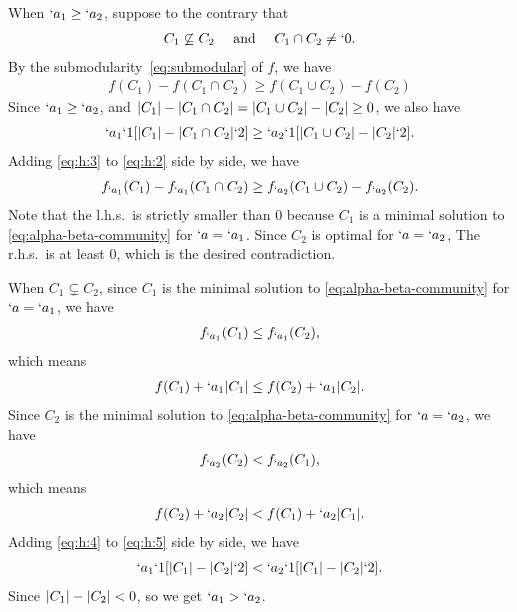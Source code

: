 \begin{Proof}
  When $`a_1 \geq `a_2$, suppose to the contrary that
  \begin{align}
    C_1\not \subseteq C_2 \kern1em \text{ and }\kern1em C_1\cap C_2\neq `0. \label{eq:h:1}
  \end{align}
  By the submodularity~\eqref{eq:submodular} of $f$, we have 
  \begin{align}
    f(C_1) - f(C_1\cap C_2) \geq f(C_1\cup C_2) - f(C_2) \label{eq:h:2}
  \end{align}
  Since $`a_1\geq `a_2$, and $\lvert C_1\rvert - \lvert C_1\cap C_2\rvert
  = \lvert C_1\cup C_2\rvert - \lvert C_2\rvert \geq 0$, we also have
  \begin{align}
    `a_1 `1[\lvert C_1\rvert- \lvert C_1\cap C_2\rvert`2]
    \geq  `a_2 `1[\lvert C_1\cup C_2\rvert - \lvert C_2\rvert`2]. \label{eq:h:3}
  \end{align}
  Adding \eqref{eq:h:3} to \eqref{eq:h:2} side by side, we have
  \begin{align*}
    f_{`a_1}(C_1) - f_{`a_1}(C_1\cap C_2) \geq f_{`a_2}(C_1\cup C_2) - f_{`a_2}(C_2).
  \end{align*}
  Note that the l.h.s.\ is strictly smaller than $0$ because $C_1$ is a minimal solution to \eqref{eq:alpha-beta-community} for $`a=`a_1$. Since $C_2$ is optimal for $`a=`a_2$, The r.h.s.\ is at least $0$, which is the desired contradiction.
  
  When $C_1\subsetneq C_2$, since $C_1$ is the minimal solution to \eqref{eq:alpha-beta-community} for $`a=`a_1$, we have 
  \begin{align*}
  f_{`a_1}(C_1) \leq f_{`a_1}(C_2),
  \end{align*}
  which means 
  \begin{align}
  f(C_1) + `a_1 \lvert C_1\rvert \leq f(C_2) + `a_1 \lvert C_2\rvert. \label{eq:h:4}
  \end{align}
  Since $C_2$ is the minimal solution to \eqref{eq:alpha-beta-community} for $`a=`a_2$, we have 
  \begin{align*}
  f_{`a_2}(C_2) < f_{`a_2}(C_1),
  \end{align*}
  which means 
  \begin{align}
  f(C_2) + `a_2 \lvert C_2\rvert < f(C_1) + `a_2 \lvert C_1\rvert. \label{eq:h:5}
  \end{align}
  Adding \eqref{eq:h:4} to \eqref{eq:h:5} side by side, we have
  \begin{align*}
  `a_1 `1[\lvert C_1\rvert - \lvert C_2\rvert`2] < `a_2 `1[\lvert C_1\rvert - \lvert C_2\rvert`2].
  \end{align*}
  Since $\lvert C_1\rvert - \lvert C_2\rvert < 0$, so we get $`a_1 > `a_2$.
  

\end{Proof}
